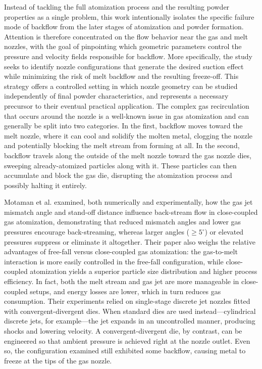\documentclass[../../main.tex]{subfiles}
\begin{document}
Instead of tackling the full atomization process and the resulting powder properties as a single problem, this work intentionally isolates the specific failure mode of backflow from the later stages of atomization and powder formation. Attention is therefore concentrated on the flow behavior near the gas and melt nozzles, with the goal of pinpointing which geometric parameters control the pressure and velocity fields responsible for backflow. More specifically, the study seeks to identify nozzle configurations that generate the desired suction effect while minimizing the risk of melt backflow and the resulting freeze-off. This strategy offers a controlled setting in which nozzle geometry can be studied independently of final powder characteristics, and represents a necessary precursor to their eventual practical application. The complex gas recirculation that occurs around the nozzle is a well-known issue in gas atomization and can generally be split into two categories. In the first, backflow moves toward the melt nozzle, where it can cool and solidify the molten metal, clogging the nozzle and potentially blocking the melt stream from forming at all. In the second, backflow travels along the outside of the melt nozzle toward the gas nozzle dies, sweeping already-atomized particles along with it. These particles can then accumulate and block the gas die, disrupting the atomization process and possibly halting it entirely.

Motaman et al. \cite{Motaman2013NumericalExperimental} examined, both numerically and experimentally, how the gas jet mismatch angle and stand-off distance influence back-stream flow in close-coupled gas atomization, demonstrating that reduced mismatch angles and lower gas pressures encourage back-streaming, whereas larger angles ($\geq 5^\circ$) or elevated pressures suppress or eliminate it altogether. Their paper also weighs the relative advantages of free-fall versus close-coupled gas atomization: the gas-to-melt interaction is more easily controlled in the free-fall configuration, while close-coupled atomization yields a superior particle size distribution and higher process efficiency. In fact, both the melt stream and gas jet are more manageable in close-coupled setups, and energy losses are lower, which in turn reduces gas consumption. Their experiments relied on single-stage discrete jet nozzles fitted with convergent-divergent dies. When standard dies are used instead—cylindrical discrete jets, for example—the jet expands in an uncontrolled manner, producing shocks and lowering velocity. A convergent-divergent die, by contrast, can be engineered so that ambient pressure is achieved right at the nozzle outlet. Even so, the configuration examined still exhibited some backflow, causing metal to freeze at the tips of the gas nozzle.
\end{document}

